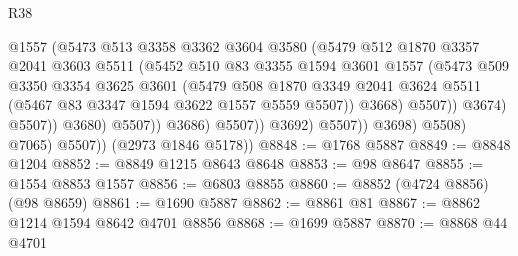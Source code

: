 \begin{lexlean}{R38}
\begin{coremodule}
                                      @1557
                                      (@5473
                                        @513
                                        @3358
                                        @3362
                                        @3604
                                        @3580
                                        (@5479
                                          @512
                                          @1870
                                          @3357
                                          @2041
                                          @3603
                                          @5511
                                          (@5452
                                            @510
                                            @83
                                            @3355
                                            @1594
                                            @3601
                                            @1557
                                            (@5473
                                              @509
                                              @3350
                                              @3354
                                              @3625
                                              @3601
                                              (@5479
                                                @508
                                                @1870
                                                @3349
                                                @2041
                                                @3624
                                                @5511
                                                (@5467 @83 @3347 @1594 @3622 @1557 @5559 @5507))
                                              @3668)
                                            @5507))
                                        @3674)
                                      @5507))
                                  @3680)
                                @5507))
                            @3686)
                          @5507))
                      @3692)
                    @5507))
                @3698)
              @5508)
            @7065)
          @5507))
      (@2973 @1846 @5178))
@8848 := @1768 @5887
@8849 := @8848 @1204
@8852 := @8849 @1215 @8643 @8648
@8853 := @98 @8647
@8855 := @1554 @8853 @1557
@8856 := @6803 @8855
@8860 := @8852 (@4724 @8856) (@98 @8659)
@8861 := @1690 @5887
@8862 := @8861 @81
@8867 := @8862 @1214 @1594 @8642 @4701 @8856
@8868 := @1699 @5887
@8870 := @8868 @44 @4701

\end{coremodule}
\end{lexlean}

